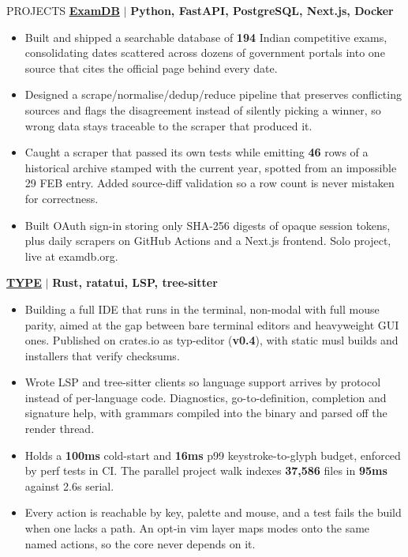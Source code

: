 \documentclass{resume} %
\begin{document}
\begin{rSection}{PROJECTS}
    \textbf{\href{https://examdb.org}{ExamDB}} \(\mid\) \textbf{Python, FastAPI, PostgreSQL, Next.js, Docker}
\begin{itemize}
\itemsep -3pt{}
\item Built and shipped a searchable database of \textbf{194} Indian competitive exams, consolidating dates scattered across dozens of government portals into one source that cites the official page behind every date.
\item Designed a scrape/normalise/dedup/reduce pipeline that preserves conflicting sources and flags the disagreement instead of silently picking a winner, so wrong data stays traceable to the scraper that produced it.
\item Caught a scraper that passed its own tests while emitting \textbf{46} rows of a historical archive stamped with the current year, spotted from an impossible 29 FEB entry. Added source-diff validation so a row count is never mistaken for correctness.
\item Built OAuth sign-in storing only SHA-256 digests of opaque session tokens, plus daily scrapers on GitHub Actions and a Next.js frontend. Solo project, live at examdb.org.
\end{itemize}

\textbf{\href{https://github.com/Pranjal-SB/type}{TYPE}} \(\mid\) \textbf{Rust, ratatui, LSP, tree-sitter}
\begin{itemize}
\itemsep -3pt{}
\item Building a full IDE that runs in the terminal, non-modal with full mouse parity, aimed at the gap between bare terminal editors and heavyweight GUI ones. Published on crates.io as typ-editor (\textbf{v0.4}), with static musl builds and installers that verify checksums.
\item Wrote LSP and tree-sitter clients so language support arrives by protocol instead of per-language code. Diagnostics, go-to-definition, completion and signature help, with grammars compiled into the binary and parsed off the render thread.
\item Holds a \textbf{100ms} cold-start and \textbf{16ms} p99 keystroke-to-glyph budget, enforced by perf tests in CI. The parallel project walk indexes \textbf{37,586} files in \textbf{95ms} against 2.6s serial.
\item Every action is reachable by key, palette and mouse, and a test fails the build when one lacks a path. An opt-in vim layer maps modes onto the same named actions, so the core never depends on it.
\end{itemize}


\end{rSection}
\end{document}
